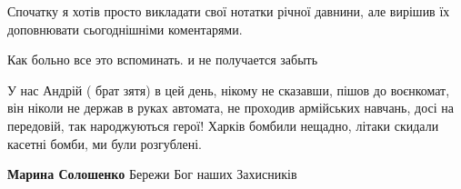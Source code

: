  
 
 
 
 

\qqSecCmt


Спочатку я хотів просто викладати свої нотатки річної давнини, але вирішив їх
доповнювати сьогоднішніми коментарями.


Как больно все это вспоминать. и не получается забыть


У нас Андрій ( брат зятя) в цей день, нікому не сказавши, пішов до воєнкомат,
він ніколи не держав в руках автомата, не проходив армійських навчань, досі на
передовій, так народжуються герої! Харків бомбили нещадно, літаки скидали
касетні бомби, ми були розгублені.

\begin{itemize} %
\textbf{Марина Солошенко} Бережи Бог наших Захисників
\end{itemize} %
